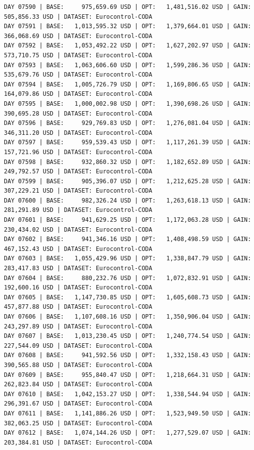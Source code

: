 \documentclass[11pt,a4paper]{article}
\begin{document}
\begin{verbatim}
DAY 07590 | BASE:     975,659.69 USD | OPT:   1,481,516.02 USD | GAIN: 505,856.33 USD | DATASET: Eurocontrol-CODA
DAY 07591 | BASE:   1,013,595.32 USD | OPT:   1,379,664.01 USD | GAIN: 366,068.69 USD | DATASET: Eurocontrol-CODA
DAY 07592 | BASE:   1,053,492.22 USD | OPT:   1,627,202.97 USD | GAIN: 573,710.75 USD | DATASET: Eurocontrol-CODA
DAY 07593 | BASE:   1,063,606.60 USD | OPT:   1,599,286.36 USD | GAIN: 535,679.76 USD | DATASET: Eurocontrol-CODA
DAY 07594 | BASE:   1,005,726.79 USD | OPT:   1,169,806.65 USD | GAIN: 164,079.86 USD | DATASET: Eurocontrol-CODA
DAY 07595 | BASE:   1,000,002.98 USD | OPT:   1,390,698.26 USD | GAIN: 390,695.28 USD | DATASET: Eurocontrol-CODA
DAY 07596 | BASE:     929,769.83 USD | OPT:   1,276,081.04 USD | GAIN: 346,311.20 USD | DATASET: Eurocontrol-CODA
DAY 07597 | BASE:     959,539.43 USD | OPT:   1,117,261.39 USD | GAIN: 157,721.96 USD | DATASET: Eurocontrol-CODA
DAY 07598 | BASE:     932,860.32 USD | OPT:   1,182,652.89 USD | GAIN: 249,792.57 USD | DATASET: Eurocontrol-CODA
DAY 07599 | BASE:     905,396.07 USD | OPT:   1,212,625.28 USD | GAIN: 307,229.21 USD | DATASET: Eurocontrol-CODA
DAY 07600 | BASE:     982,326.24 USD | OPT:   1,263,618.13 USD | GAIN: 281,291.89 USD | DATASET: Eurocontrol-CODA
DAY 07601 | BASE:     941,629.25 USD | OPT:   1,172,063.28 USD | GAIN: 230,434.02 USD | DATASET: Eurocontrol-CODA
DAY 07602 | BASE:     941,346.16 USD | OPT:   1,408,498.59 USD | GAIN: 467,152.43 USD | DATASET: Eurocontrol-CODA
DAY 07603 | BASE:   1,055,429.96 USD | OPT:   1,338,847.79 USD | GAIN: 283,417.83 USD | DATASET: Eurocontrol-CODA
DAY 07604 | BASE:     880,232.76 USD | OPT:   1,072,832.91 USD | GAIN: 192,600.16 USD | DATASET: Eurocontrol-CODA
DAY 07605 | BASE:   1,147,730.85 USD | OPT:   1,605,608.73 USD | GAIN: 457,877.88 USD | DATASET: Eurocontrol-CODA
DAY 07606 | BASE:   1,107,608.16 USD | OPT:   1,350,906.04 USD | GAIN: 243,297.89 USD | DATASET: Eurocontrol-CODA
DAY 07607 | BASE:   1,013,230.45 USD | OPT:   1,240,774.54 USD | GAIN: 227,544.09 USD | DATASET: Eurocontrol-CODA
DAY 07608 | BASE:     941,592.56 USD | OPT:   1,332,158.43 USD | GAIN: 390,565.88 USD | DATASET: Eurocontrol-CODA
DAY 07609 | BASE:     955,840.47 USD | OPT:   1,218,664.31 USD | GAIN: 262,823.84 USD | DATASET: Eurocontrol-CODA
DAY 07610 | BASE:   1,042,153.27 USD | OPT:   1,338,544.94 USD | GAIN: 296,391.67 USD | DATASET: Eurocontrol-CODA
DAY 07611 | BASE:   1,141,886.26 USD | OPT:   1,523,949.50 USD | GAIN: 382,063.25 USD | DATASET: Eurocontrol-CODA
DAY 07612 | BASE:   1,074,144.26 USD | OPT:   1,277,529.07 USD | GAIN: 203,384.81 USD | DATASET: Eurocontrol-CODA

\end{verbatim}
\end{document}

